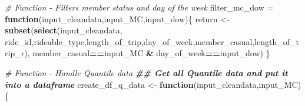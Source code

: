 \documentclass[
]{article}
\newenvironment{Shaded}{\begin{snugshade}}{\end{snugshade}}
\newcommand{\CommentTok}[1]{\textcolor[rgb]{0.56,0.35,0.01}{\textit{#1}}}
\newcommand{\ControlFlowTok}[1]{\textcolor[rgb]{0.13,0.29,0.53}{\textbf{#1}}}
\newcommand{\DocumentationTok}[1]{\textcolor[rgb]{0.56,0.35,0.01}{\textbf{\textit{#1}}}}
\newcommand{\FunctionTok}[1]{\textcolor[rgb]{0.13,0.29,0.53}{\textbf{#1}}}
\newcommand{\NormalTok}[1]{#1}
\newcommand{\OtherTok}[1]{\textcolor[rgb]{0.56,0.35,0.01}{#1}}
\newcommand{\SpecialCharTok}[1]{\textcolor[rgb]{0.81,0.36,0.00}{\textbf{#1}}}
\begin{document}
\begin{Shaded}
\begin{Highlighting}[]
\CommentTok{\# Function {-} Filters member status and day of the week}
\NormalTok{filter\_mc\_dow }\OtherTok{=} \ControlFlowTok{function}\NormalTok{(input\_cleandata,input\_MC,input\_dow)\{}
\NormalTok{  return }\OtherTok{\textless{}{-}} \FunctionTok{subset}\NormalTok{(}\FunctionTok{select}\NormalTok{(input\_cleandata, ride\_id,rideable\_type,length\_of\_trip,day\_of\_week,member\_casual,length\_of\_trip\_r),}
\NormalTok{                   member\_casual}\SpecialCharTok{==}\NormalTok{input\_MC }\SpecialCharTok{\&}\NormalTok{ day\_of\_week}\SpecialCharTok{==}\NormalTok{input\_dow)}
\NormalTok{\}}

\CommentTok{\# Function {-} Handle Quantile data}
\DocumentationTok{\#\# Get all Quantile data and put it into a dataframe}
\NormalTok{create\_df\_q\_data }\OtherTok{\textless{}{-}} \ControlFlowTok{function}\NormalTok{(input\_cleandata,input\_MC)\{}
  

\end{Highlighting}
\end{Shaded}
\end{document}
